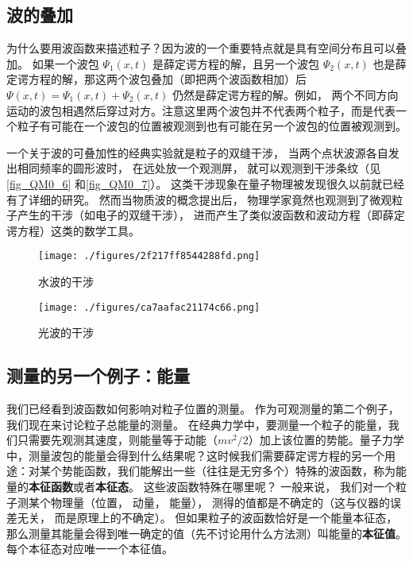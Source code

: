 \subsection{波的叠加}
为什么要用波函数来描述粒子？因为波的一个重要特点就是具有空间分布且可以叠加。 如果一个波包 $\Psi_1(x, t)$ 是薛定谔方程的解，且另一个波包 $\Psi_2(x, t)$ 也是薛定谔方程的解，那这两个波包叠加（即把两个波函数相加）后 $\Psi(x, t) = \Psi_1(x, t) + \Psi_2(x, t)$ 仍然是薛定谔方程的解。例如， 两个不同方向运动的波包相遇然后穿过对方。注意这里两个波包并不代表两个粒子，而是代表一个粒子有可能在一个波包的位置被观测到也有可能在另一个波包的位置被观测到。

一个关于波的可叠加性的经典实验就是粒子的双缝干涉， 当两个点状波源各自发出相同频率的圆形波时， 在远处放一个观测屏， 就可以观测到干涉条纹（见\autoref{fig_QM0_6} 和\autoref{fig_QM0_7}）。 这类干涉现象在量子物理被发现很久以前就已经有了详细的研究。 然而当物质波的概念提出后， 物理学家竟然也观测到了微观粒子产生的干涉（如电子的双缝干涉）， 进而产生了类似波函数和波动方程（即薛定谔方程）这类的数学工具。

\begin{figure}[ht]
\centering
\texttt{[image: ./figures/2f217ff8544288fd.png]}
\caption{水波的干涉} \label{fig_QM0_6}
\end{figure}

\begin{figure}[ht]
\centering
\texttt{[image: ./figures/ca7aafac21174c66.png]}
\caption{光波的干涉} \label{fig_QM0_7}
\end{figure}


\subsection{测量的另一个例子：能量}
我们已经看到波函数如何影响对粒子位置的测量。 作为可观测量的第二个例子， 我们现在来讨论粒子总能量的测量。 在经典力学中，要测量一个粒子的能量，我们只需要先观测其速度，则能量等于动能（$mv^2/2$）加上该位置的势能。量子力学中，测量波包的能量会得到什么结果呢？这时候我们需要薛定谔方程的另一个用途：对某个势能函数，我们能解出一些（往往是无穷多个）特殊的波函数，称为能量的\textbf{本征函数}或者\textbf{本征态}。 这些波函数特殊在哪里呢？ 一般来说， 我们对一个粒子测某个物理量（位置， 动量， 能量）， 测得的值都是不确定的（这与仪器的误差无关， 而是原理上的不确定）。 但如果粒子的波函数恰好是一个能量本征态， 那么测量其能量会得到唯一确定的值（先不讨论用什么方法测）叫能量的\textbf{本征值}。 每个本征态对应唯一一个本征值。

